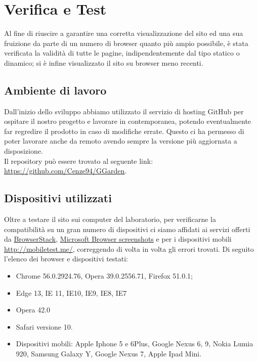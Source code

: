 \section{Verifica e Test}{
	Al fine di riuscire a garantire una corretta visualizzazione del sito ed una sua fruizione da parte di un numero di browser quanto più ampio possibile, è stata verificata la validità di tutte le pagine, indipendentemente dal tipo statico o dinamico; si è infine visualizzato il sito su browser meno recenti.
	\subsection{Ambiente di lavoro}{
		Dall'inizio dello sviluppo abbiamo utilizzato il servizio di hosting GitHub per ospitare il nostro progetto e lavorare in contemporanea, potendo eventualmente far regredire il prodotto in caso di modifiche errate. Questo ci ha permesso di poter lavorare anche da remoto avendo sempre la versione più aggiornata a disposizione.\\
		Il repository può essere trovato al seguente link: \url{https://github.com/Cenze94/GGarden}.
	}
	\subsection{Dispositivi utilizzati}{
		Oltre a testare il sito sui computer del laboratorio, per verificarne la compatibilità su un gran numero di dispositivi ci siamo affidati ai servizi offerti da \href{https://www.browserstack.com/screenshots}{BrowserStack}, \href{https://developer.microsoft.com/en-us/microsoft-edge/tools/screenshots/}{Microsoft Browser screenshots} e per i dispositivi mobili \url{http://mobiletest.me/}, correggendo di volta in volta gli errori trovati.
		Di seguito l'elenco dei browser e dispositivi testati:
		\begin{itemize}\itemsep1pt
			\item Chrome 56.0.2924.76, Opera 39.0.2556.71, Firefox 51.0.1;
			\item Edge 13, IE 11, IE10, IE9, IE8, IE7
			\item Opera 42.0
			\item Safari versione 10.
			\item Dispositivi mobili: Apple Iphone 5 e 6Plus, Google Nexus 6, 9, Nokia Lumia 920, Samsung Galaxy Y, Google Nexus 7, Apple Ipad Mini.
		\end{itemize}
	}
}
